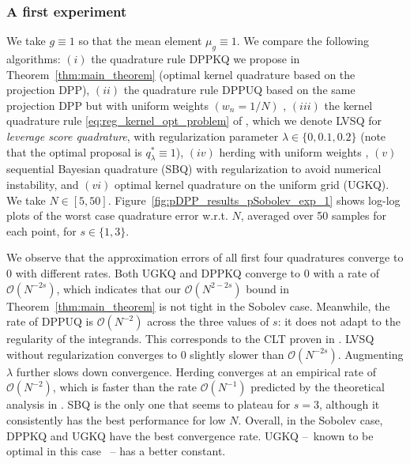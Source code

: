 \documentclass[twoside,11pt]{book}
\numberwithin{theorem}{chapter}
\numberwithin{definition}{chapter}
\numberwithin{proposition}{chapter}
\numberwithin{corollary}{chapter}
\numberwithin{example}{chapter}
\numberwithin{lemma}{chapter}
\numberwithin{assumption}{chapter}
\begin{document}
\subsubsection{A first experiment}
 We take $g\equiv 1$ so that the mean element $\mu_{g} \equiv 1$. We compare the following algorithms: $(i)$ the quadrature rule DPPKQ we propose in Theorem~\ref{thm:main_theorem} (optimal kernel quadrature based on the projection DPP), $(ii)$ the quadrature rule DPPUQ based on the same projection DPP but with uniform weights $(w_{n} = 1/N)$ \cite{Joh97}, $(iii)$ the kernel quadrature rule \eqref{eq:reg_kernel_opt_problem} of \cite{Bac17}, which we denote LVSQ for \emph{leverage score quadrature}, with regularization parameter $\lambda \in \{0,0.1,0.2\}$ (note that the optimal proposal is $q_{\lambda}^* \equiv 1$), $(iv)$ herding with uniform weights \citep{BaLaOb12,ChWeSm10}, $(v)$ sequential Bayesian quadrature (SBQ) \citep{HuDu12} with regularization to avoid numerical instability, and $(vi)$ optimal kernel quadrature on the uniform grid (UGKQ). We take $N \in [5,50]$. Figure~\ref{fig:pDPP_results_pSobolev_exp_1} shows log-log plots of the worst case quadrature error w.r.t. $N$, averaged over 50 samples for each point, for $s \in \{1,3\}$.


 We observe that the approximation errors of all first four quadratures converge to $0$ with different rates. Both UGKQ and DPPKQ converge to $0$ with a rate of $\mathcal{O}(N^{-2s})$, which indicates that our $\mathcal{O}(N^{2-2s})$ bound in Theorem~\ref{thm:main_theorem} is not tight in the Sobolev case. Meanwhile, the rate of DPPUQ is $\mathcal{O}(N^{-2})$ across the three values of $s$: it does not adapt to the regularity of the integrands. This corresponds to the CLT proven in \cite{Joh97}.
  LVSQ without regularization converges to $0$ slightly slower than $\mathcal{O}(N^{-2s})$. Augmenting $\lambda$ further slows down convergence. Herding converges at an empirical rate of $\mathcal{O}(N^{-2})$, which is faster than the rate $\mathcal{O}(N^{-1})$ predicted by the theoretical analysis in \cite{BaLaOb12,ChWeSm10}. SBQ is the only one that seems to plateau for $s = 3$, although it consistently has the best performance for low $N$.
Overall, in the Sobolev case, DPPKQ and UGKQ have the best convergence rate. UGKQ --~known to be optimal in this case \cite{Boj81}~-- has a better constant.
\end{document}
